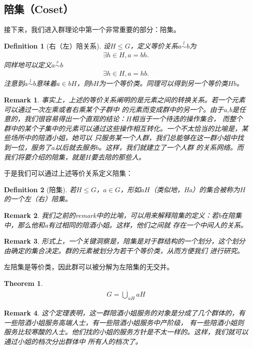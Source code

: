 \documentclass[12pt,a4paper,UTF8]{ctexbook}
\theoremstyle{plain}
\newtheorem{theorem}{\indent Theorem}[section]
\newtheorem{definition}{\indent Definition}[section]
\newtheorem{remark}{\indent Remark}[section]
\begin{document}
\subsection{陪集（Coset）}
接下来，我们进入群理论中第一个非常重要的部分：陪集。
\begin{definition}[右（左）陪关系]
    设$H\leq G$，定义等价关系$a\overset{l}{\sim}b$为
    \begin{align*} 
        \exists h\in H, a=bh.
    \end{align*}
    同样地可以定义$a\overset{r}{\sim}b$
    \begin{align*} 
        \exists h\in H, a=hb.
    \end{align*}
    注意到$a\overset{l}{\sim}b$意味着$a\in bH$，则$bH$为一个等价类。同理可以得到另一个等价类$Hb$。
\end{definition}
\begin{remark}
    事实上，上述的等价关系阐明的是元素之间的转换关系。若一个元素可以通过一次左乘或者右乘某个子群中
    的元素而变成群中的另一个。由于a,b是任意的，我们很容易得出一个直观的结论：$H$相当于一个待选的操作集合，
    而整个群中的某个子集中的元素可以通过这些操作相互转化。一个不太恰当的比喻是，某些场所中的陪酒小姐，她可以
    只服务某一个人群，我们总能够在这一群小姐中找到一位，服务了$a$以后就去服务$b$。这样，我们就建立了一个人群
    的关系网络。而我们将要介绍的陪集，就是$H$要去陪的那些人。
\end{remark}
于是我们可以通过上述等价关系定义陪集：
\begin{definition}[陪集]
    若$H\leq G$，$a\in G$，形如$aH$（类似地，Ha）的集合被称为$H$的一个左（右）陪集。
\end{definition}
\begin{remark}
    我们之前的remark中的比喻，可以用来解释陪集的定义：若b在陪集中，那么他和a有过相同的陪酒小姐。这样，他们之间就
    存在一个中间人的关系。
\end{remark}
\begin{remark}
    形式上，一个关键洞察是，陪集是对于群结构的一个划分，这个划分由确定的集合决定。群的元素被划分为若干个等价类，从而方便我们
    进行研究。
\end{remark}
左陪集是等价类，因此群可以被分解为左陪集的无交并。
\begin{theorem}
    \begin{align*}
    G = \dot{\bigcup}_{aH} aH
    \end{align*}
\end{theorem}
\begin{remark}
    这个定理表明，这一群陪酒小姐服务的对象是分成了几个群体的，有一些陪酒小姐服务高端人士，有一些陪酒小姐服务中产阶级，
    有一些陪酒小姐则服务比较寒酸的人士。他们找的小姐的服务方针是不太一样的。这样，我们就可以通过小姐的档次分出群体中
    所有人的档次了。
\end{remark}
\end{document}
